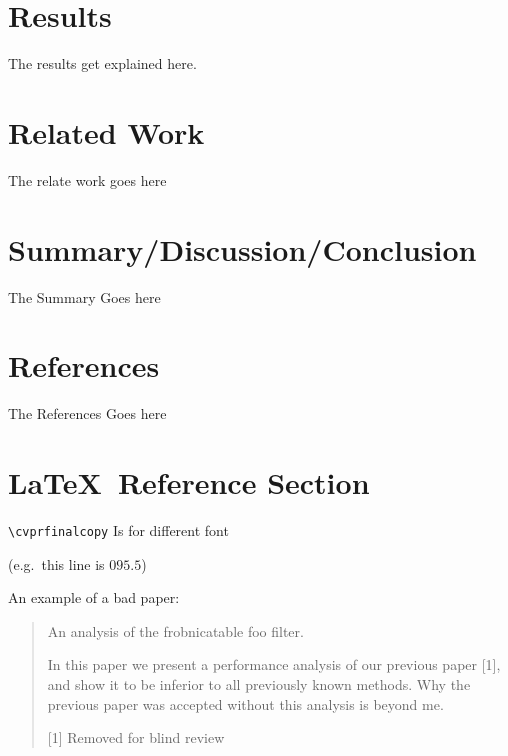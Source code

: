 \documentclass[10pt,twocolumn,letterpaper]{article}
\begin{document}
\section{Results}
The results get explained here.

\section{Related Work}
The relate work goes here

\section{Summary/Discussion/Conclusion}
The Summary Goes here

\section{References}
The References Goes here









\section{\LaTeX\ Reference Section}
\verb'\cvprfinalcopy' Is for different font

(e.g.\ this line is $095.5$)

An example of a bad paper:
\begin{quote}
\begin{center}
    An analysis of the frobnicatable foo filter.
\end{center}

   In this paper we present a performance analysis of our
   previous paper [1], and show it to be inferior to all
   previously known methods.  Why the previous paper was
   accepted without this analysis is beyond me.

   [1] Removed for blind review
\end{quote}
\end{document}
